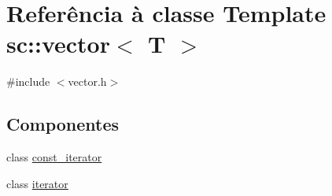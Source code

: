 \hypertarget{classsc_1_1vector}{}\section{Referência à classe Template sc\+:\+:vector$<$ T $>$}
\label{classsc_1_1vector}


{\ttfamily \#include $<$vector.\+h$>$}

\subsection*{Componentes}
\begin{DoxyCompactItemize}
\item 
class \mbox{\hyperlink{classsc_1_1vector_1_1const__iterator}{const\+\_\+iterator}}
\item 
class \mbox{\hyperlink{classsc_1_1vector_1_1iterator}{iterator}}
\end{DoxyCompactItemize}
